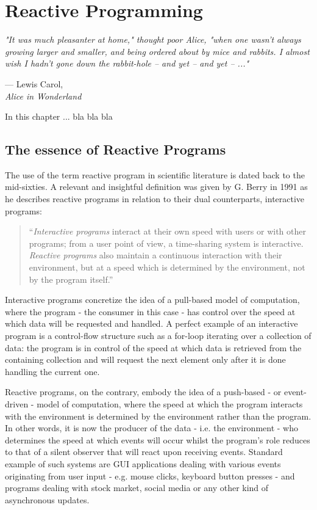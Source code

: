\let\textcircled=\pgftextcircled
\chapter{Reactive Programming}

\epigraph{\hspace{4ex}\textit{"It was much pleasanter at home," thought poor Alice, "when one wasn't always growing larger and smaller, and being ordered about by mice and rabbits. I almost wish I hadn't gone down the rabbit-hole -- and yet -- and yet -- ..."}}{--- Lewis Carol,\\ \textit{Alice in Wonderland}}


In this chapter ... bla bla bla


\section{The essence of Reactive Programs}

The use of the term reactive program in scientific literature is dated back to the mid-sixties\cite{scopus-reactive}. A relevant and insightful definition was given by G. Berry in 1991\cite{berry1991reactive} as he describes reactive programs in relation to their dual counterparts, interactive programs:

\begin{quote}
\hspace{4ex}``\textit{Interactive programs} interact at their own speed with users or with other programs; from a user point of view, a time-sharing system is interactive. \textit{Reactive programs} also maintain a continuous interaction with their environment, but at a speed which is determined by the environment, not by the program itself.''
\end{quote}

Interactive programs concretize the idea of a pull-based model of computation, where the program - the consumer in this case - has control over the speed at which data will be requested and handled. A perfect example of an interactive program is a control-flow structure such as a for-loop iterating over a collection of data: the program is in control of the speed at which data is retrieved from the containing collection and will request the next element only after it is done handling the current one.

Reactive programs, on the contrary, embody the idea of a push-based - or event-driven - model of computation, where the speed at which the program interacts with the environment is determined by the environment rather than the program. In other words, it is now the producer of the data - i.e. the environment - who determines the speed at which events will occur whilst the program's role reduces to that of a silent observer that will react upon receiving events. Standard example of such systems are GUI applications dealing with various events originating from user input - e.g. mouse clicks, keyboard button presses - and programs dealing with stock market, social media or any other kind of asynchronous updates.  

